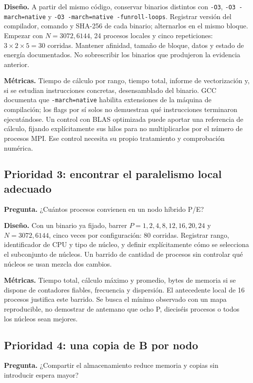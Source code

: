 \textbf{Diseño.} A partir del mismo código, conservar binarios distintos con \texttt{-O3}, \texttt{-O3 -march=native} y \texttt{-O3 -march=native -funroll-loops}. Registrar versión del compilador, comando y SHA-256 de cada binario; alternarlos en el mismo bloque. Empezar con $N=3072,6144$, 24 procesos locales y cinco repeticiones: $3\times2\times5=30$ corridas. Mantener afinidad, tamaño de bloque, datos y estado de energía documentados. No sobrescribir los binarios que produjeron la evidencia anterior.

\textbf{Métricas.} Tiempo de cálculo por rango, tiempo total, informe de vectorización y, si se estudian instrucciones concretas, desensamblado del binario. GCC documenta que \texttt{-march=native} habilita extensiones de la máquina de compilación\cite{gcc-x86}; los flags por sí solos no demuestran qué instrucciones terminaron ejecutándose. Un control con BLAS optimizada puede aportar una referencia de cálculo, fijando explícitamente sus hilos para no multiplicarlos por el número de procesos MPI. Ese control necesita su propio tratamiento y comprobación numérica.

\subsection{Prioridad 3: encontrar el paralelismo local adecuado}

\textbf{Pregunta.} ¿Cuántos procesos convienen en un nodo híbrido P/E?

\textbf{Diseño.} Con un binario ya fijado, barrer $P=1,2,4,8,12,16,20,24$ y $N=3072,6144$, cinco veces por configuración: 80 corridas. Registrar rango, identificador de CPU y tipo de núcleo, y definir explícitamente cómo se selecciona el subconjunto de núcleos. Un barrido de cantidad de procesos sin controlar qué núcleos se usan mezcla dos cambios.

\textbf{Métricas.} Tiempo total, cálculo máximo y promedio, bytes de memoria si se dispone de contadores fiables, frecuencia y dispersión. El antecedente local de 16 procesos justifica este barrido. Se busca el mínimo observado con un mapa reproducible, no demostrar de antemano que ocho P, dieciséis procesos o todos los núcleos sean mejores.

\subsection{Prioridad 4: una copia de B por nodo}

\textbf{Pregunta.} ¿Compartir el almacenamiento reduce memoria y copias sin introducir espera mayor?


